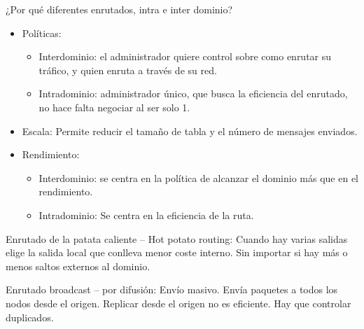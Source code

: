 \documentclass[12pt, twoside, openright]{report} %
\begin{document}
\pagebreak
	¿Por qué diferentes enrutados, intra e inter dominio?

    \begin{itemize}
    \item
      Políticas:

      \begin{itemize}
      \item
        Interdominio: el administrador quiere control sobre como enrutar
        su tráfico, y quien enruta a través de su red.
      \item
        Intradominio: administrador único, que busca la eficiencia del
        enrutado, no hace falta negociar al ser solo 1.
      \end{itemize}
    \item
      Escala: Permite reducir el tamaño de tabla y el número de mensajes
      enviados.
    \item
      Rendimiento:

      \begin{itemize}
      \item
        Interdominio: se centra en la política de alcanzar el dominio
        más que en el rendimiento.
      \item
        Intradominio: Se centra en la eficiencia de la ruta.
      \end{itemize}
    \end{itemize}

	Enrutado de la patata caliente -- Hot potato routing: Cuando hay
    varias salidas elige la salida local que conlleva menor coste
    interno. Sin importar si hay más o menos saltos externos al dominio.

	Enrutado broadcast -- por difusión: Envío masivo. Envía paquetes a
    todos los nodos desde el origen. Replicar desde el origen no es
    eficiente. Hay que controlar duplicados.
\end{document}
